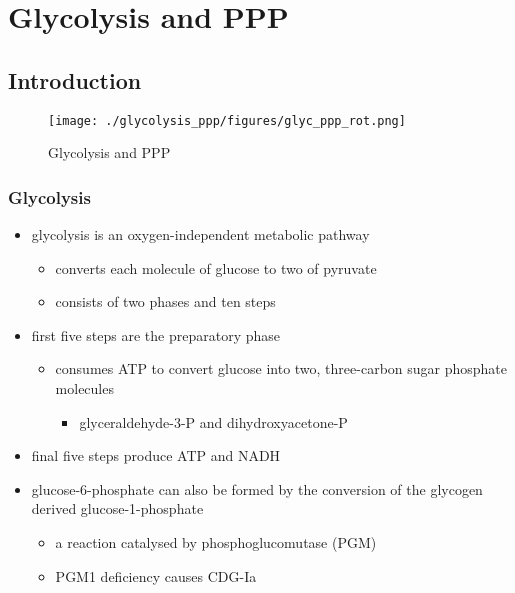 \documentclass{scrartcl}
\begin{document}
\section{Glycolysis and PPP}
\label{sec:org9f0e23b}
\subsection{Introduction}
\label{sec:org5fd2075}
\begin{figure}[htbp]
\centering
\texttt{[image: ./glycolysis\_ppp/figures/glyc\_ppp\_rot.png]}
\caption{\label{fig:orgc7568ca}
Glycolysis and PPP}
\end{figure}

\subsubsection{Glycolysis}
\label{sec:orgacb3d37}
\begin{itemize}
\item glycolysis is an oxygen-independent metabolic pathway
\begin{itemize}
\item converts each molecule of glucose to two of pyruvate
\item consists of two phases and ten steps
\end{itemize}
\item first five steps are the preparatory phase
\begin{itemize}
\item consumes ATP to convert glucose into two, three-carbon sugar
phosphate molecules
\begin{itemize}
\item glyceraldehyde-3-P and dihydroxyacetone-P
\end{itemize}
\end{itemize}
\item final five steps produce ATP and NADH

\item glucose-6-phosphate can also be formed by the conversion of the
glycogen derived glucose-1-phosphate
\begin{itemize}
\item a reaction catalysed by phosphoglucomutase (PGM)
\item PGM1 deficiency causes CDG-Ia
\end{itemize}
\end{itemize}
\end{document}
